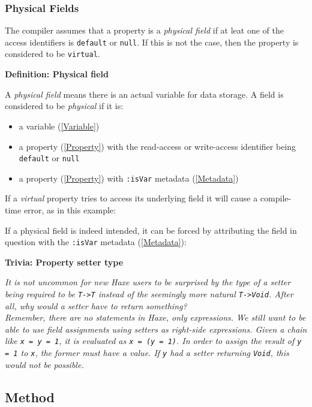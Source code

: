 \documentclass{article}
\newcommand{\type}[1]{\texttt{#1}}
\newcommand{\expr}[1]{\texttt{#1}}
\newenvironment{myshaded}
  {\def\FrameCommand{\fboxsep=\topsep\colorbox{bgcolor}}%
  \MakeFramed {\advance\hsize-\width \FrameRestore}}%
 {\endMakeFramed}
\newcommand{\define}[3][Definition]
	{\begin{myshaded}\noindent\textbf{#1: #2}\par\nobreak\noindent\ignorespaces#3\label{def:#2}\end{myshaded}}
\newcommand{\trivia}[2]
	{\begin{myshaded}\noindent\textbf{Trivia: #1}\par\nobreak\noindent\ignorespaces\textit{#2}\end{myshaded}}
\newcommand{\tref}[2]{#1 (\ref{#2})}
\newcommand{\haxe}[2][]{%
}
\begin{document}
\haxe{assets/GetterSetter.hx}

\subsubsection{Physical Fields}

The compiler assumes that a property is a \emph{physical field} if at leat one of the access identifiers is \expr{default} or \expr{null}. If this is not the case, then the property is considered to be \expr{virtual}.   

\define{Physical field}{A \emph{physical field} means there is an actual variable for data storage.  A field is considered to be \emph{physical} if it is:
	\begin{itemize}
		\item a \tref{variable}{Variable}
		\item a \tref{property}{Property} with the read-access or write-access identifier being \expr{default} or \expr{null}
		\item a \tref{property}{Property} with \expr{:isVar} \tref{metadata}{Metadata}
	\end{itemize}
}

If a \emph{virtual} property tries to access its underlying field it will cause a compile-time error, as in this example:  
\haxe{assets/GetterSetter2.hx}

If a physical field is indeed intended, it can be forced by attributing the field in question with the \expr{:isVar} \tref{metadata}{Metadata}:

\haxe{assets/GetterSetter3.hx}


\trivia{Property setter type}{It is not uncommon for new Haxe users to be surprised by the type of a setter being required to be \type{T->T} instead of the seemingly more natural \type{T->Void}. After all, why would a \emph{setter} have to return something?\\
Remember, there are no statements in Haxe, only expressions.  We still want to be able to use field assignments using setters as right-side expressions. Given a chain like \expr{x = y = 1}, it is evaluated as \expr{x = (y = 1)}. In order to assign the result of \expr{y = 1} to \expr{x}, the former must have a value. If \expr{y} had a setter returning \type{Void}, this would not be possible.}


\subsection{Method}
\label{Method}
\end{document}
